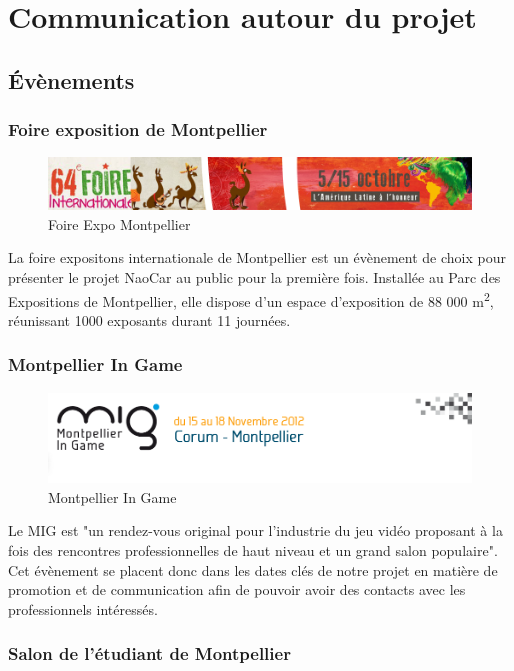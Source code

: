 \documentclass[11pt]{report} %
\begin{document}
	\section{Communication autour du projet}
		\subsection{Évènements}
			\subsubsection{Foire exposition de Montpellier}
				\begin{figure}[htb]
				\centering
				\includegraphics[width=1\textwidth]{foire-expo.png}
				\caption{Foire Expo Montpellier}
				\label{fig:Foire Expo Montpellier}
				\end{figure}
				La foire expositons internationale de Montpellier est un évènement de choix pour présenter le projet NaoCar au public pour la première fois. Installée au Parc des Expositions de Montpellier, elle dispose d'un espace d'exposition de 88 000 m\textsuperscript{2}, réunissant 1000 exposants durant 11 journées.
			\subsubsection{Montpellier In Game}
				\begin{figure}[htb]
				\centering
				\includegraphics[width=1\textwidth]{mig.png}
				\caption{Montpellier In Game}
				\label{fig:Montpellier In Game}
				\end{figure}
                                Le MIG est "un rendez-vous original pour l’industrie du jeu vidéo proposant à la fois des rencontres professionnelles de haut niveau et un grand salon populaire". Cet évènement se placent donc dans les dates clés de notre projet en matière de promotion et de communication afin de pouvoir avoir des contacts avec les professionnels intéressés.
			\subsubsection{Salon de l'étudiant de Montpellier}
\end{document}
